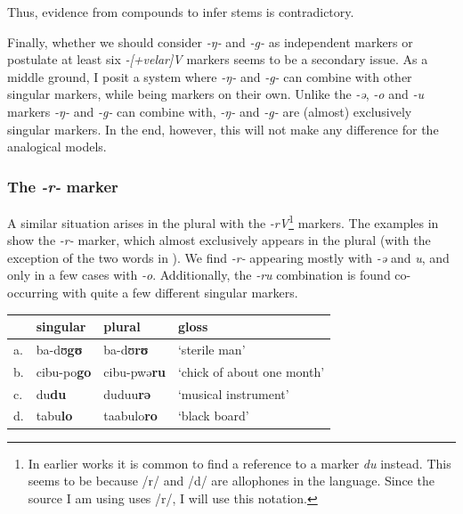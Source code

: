 Thus, evidence from compounds to infer stems is contradictory.

Finally, whether we should consider \textit{-ŋ-} and \textit{-g-} as independent markers or postulate at least six \textit{-[+velar]V} markers seems to be a secondary issue. As a middle ground, I posit a  system where \textit{-ŋ-} and \textit{-g-} can combine with other singular markers, while being markers on their own. Unlike the \textit{-ə}, \textit{-o} and \textit{-u} markers \textit{-ŋ-} and \textit{-g-} can combine with, \textit{-ŋ-} and \textit{-g-} are (almost) exclusively singular markers. In the end, however, this will not make any difference for the analogical models.

\subsubsection{The \textit{-r-} marker}

A similar situation arises in the plural with the \textit{-rV}\footnote{In earlier works it is common to find a reference to a marker \textit{du} instead. This seems to be because /r/ and /d/ are allophones in the language. Since the source I am using uses /r/, I will use this notation.} markers. The examples in  show the \textit{-r-} marker, which almost exclusively appears in the plural (with the exception of the two words in ). We find \textit{-r-} appearing mostly with \textit{-ə} and \textit{u}, and only in a few cases with \textit{-o}. Additionally, the \textit{-ru} combination is found co-occurring with quite a few different singular markers.

\begin{exe}
    \ex \label{rupl-kasem}
    \begin{tabular}[t]{llll}
      & singular  & plural     & gloss                      \\
      \midrule
      a. & ba-dʊ\textbf{gʊ}   & ba-dʊ\textbf{rʊ}    & `sterile man'              \\
      b. & cibu-po\textbf{go} & cibu-pwə\textbf{ru} & `chick of about one month' \\
      c. & du\textbf{du}      & duduu\textbf{rə}    & `musical instrument'       \\
      d. & tabu\textbf{lo}    & taabulo\textbf{ro}  & `black board'              \\
    \end{tabular}
\end{exe}

